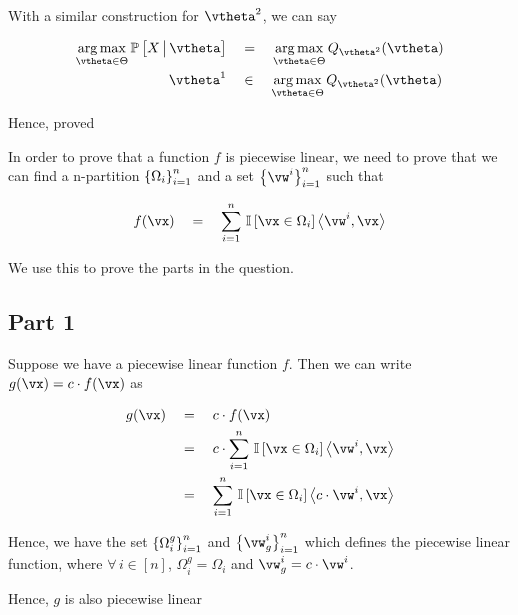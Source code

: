 \documentclass{article}
\begin{document}
\begin{mlsolution}
\begin{addmargin}{1.5em}
		With a similar construction for $\vtheta^2$, we can say

		\begin{align*}
			\argmax_{\vtheta \in \Theta} \prob{X \pipe \vtheta}	&\eq	\argmax_{\vtheta \in \Theta} Q_{\vtheta^2}(\vtheta) \\
			\vtheta^1											&\qin	\argmax_{\vtheta \in \Theta} Q_{\vtheta^2}(\vtheta)
		\end{align*} \br%

		Hence, proved

	\end{addmargin}

\end{mlsolution}

\begin{mlsolution}

	In order to prove that a function $f$ is piecewise linear, we need to prove that we can find a n-partition $\left\{ \Omega_i \right\}_{i = 1}^{n}$ and a set $\set{\vw^i}_{i = 1}^n$ such that

	\begin{align*}
		f(\vx)	\eq	\sum_{i = 1}^{n} \is{\vx \in \Omega_i} \ip{\vw^i}{\vx}
	\end{align*} \br%

	We use this to prove the parts in the question.

	\subsection*{Part 1}
	\begin{addmargin}{1.5em}

		Suppose we have a piecewise linear function $f$. Then we can write $g(\vx) = c \cdot f(\vx)$ as

		\begin{align*}
			g(\vx)	&\eq	c \cdot f(\vx) \\
					&\eq	c \cdot \sum_{i = 1}^n \is{\vx \in \Omega_i} \ip{\vw^i}{\vx} \\
					&\eq	\sum_{i = 1}^n \is{\vx \in \Omega_i} \ip{c \cdot \vw^i}{\vx}
		\end{align*}

		Hence, we have the set $\left\{ \Omega^g_i \right\}_{i = 1}^n$ and $\set{\vw_g^i}_{i = 1}^n$ which defines the piecewise linear function, where $\forall\, i \in [n]$, $\Omega^g_i = \Omega_i$ and $\vw_g^i = c \cdot \vw^i$.

		Hence, $g$ is also piecewise linear

	\end{addmargin}


\end{mlsolution}
\end{document}
